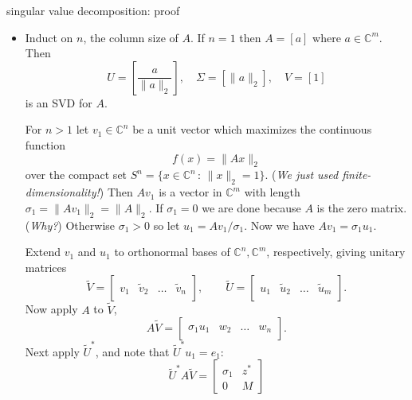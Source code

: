 \documentclass[10pt,hyperref]{beamer}
\newcommand{\CC}{\mathbb{C}}
\newcommand{\trefmatrixthree}[3]{\left[\begin{array}{c|c|c|c} & & & \\ #1 & #2 & \dots & #3 \\ & & & \end{array}\right]}
\newcommand{\blocktwo}[4]{\left[\begin{array}{c|c} #1 & #2 \\ \hline #3 & #4 \end{array}\right]}
\begin{document}
\begin{frame}{singular value decomposition: proof}

\begin{itemize}
\footnotesize
\item[\emph{proof.}] Induct on $n$, the column size of $A$.  If $n=1$ then $A=[a]$ where $a\in \CC^m$.  Then
  $$U=\left[\frac{a}{\|a\|_2}\right], \quad \Sigma=[\|a\|_2], \quad V=[1]$$
is an SVD for $A$.

\quad For $n>1$ let $v_1 \in \CC^n$ be a unit vector which maximizes the continuous function
	$$f(x) = \|A x\|_2$$
over the compact set $S^n = \{x\in\CC^n\,:\,\|x\|_2=1\}$.  (\emph{We just used finite-dimensionality!})  Then $Av_1$ is a vector in $\CC^m$ with length $\sigma_1=\|Av_1\|_2 = \|A\|_2$.  If $\sigma_1=0$ we are done because $A$ is the zero matrix.  (\emph{Why?})  Otherwise $\sigma_1>0$ so let $u_1=Av_1/\sigma_1$.  Now we have $Av_1=\sigma_1 u_1$.

\quad Extend $v_1$ and $u_1$ to orthonormal bases of $\CC^n,\CC^m$, respectively, giving unitary matrices
    $$\tilde V = \trefmatrixthree{v_1}{\tilde v_2}{\tilde v_n}, \qquad\tilde U = \trefmatrixthree{u_1}{\tilde u_2}{\tilde u_m}.$$
Now apply $A$ to $\tilde V$,
    $$A\tilde V = \trefmatrixthree{\sigma_1 u_1}{w_2}{w_n}.$$
Next apply $\tilde U^*$, and note that $\tilde U^* u_1 = e_1$:
    $$\tilde U^*A\tilde V = \blocktwo{\sigma_1}{z^*}{0}{M}$$
\normalsize
\end{itemize}
\end{frame}
\end{document}
